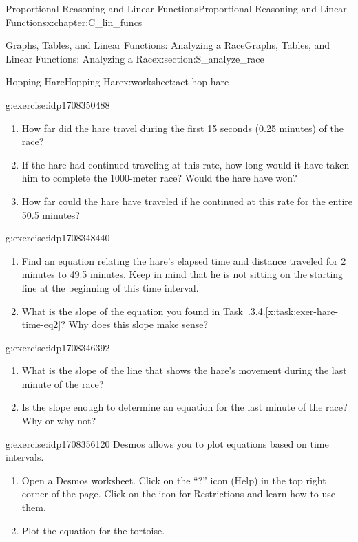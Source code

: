 \documentclass[oneside,10pt,]{book}
\newcommand{\xreffont}{\relax}
\numberwithin{equation}{chapter}
\begin{document}
\begin{chapterptx}{Proportional Reasoning and Linear Functions}{}{Proportional Reasoning and Linear Functions}{}{}{x:chapter:C_lin_funcs}
\begin{sectionptx}{Graphs, Tables, and Linear Functions: Analyzing a Race}{}{Graphs, Tables, and Linear Functions: Analyzing a Race}{}{}{x:section:S_analyze_race}
\begin{worksheet-subsection}{Hopping Hare}{}{Hopping Hare}{}{}{x:worksheet:act-hop-hare}
\begin{divisionexercise}{3}{}{}{g:exercise:idp1708350488}
\begin{enumerate}[font=\bfseries,label=(\alph*),ref=\alph*]
\item{}How far did the hare travel during the first 15 seconds (0.25 minutes) of the race?%
\item{}If the hare had continued traveling at this rate, how long would it have taken him to complete the 1000-meter race? Would the hare have won?%
\item{}How far could the hare have traveled if he continued at this rate for the entire 50.5 minutes?%
\end{enumerate}
\end{divisionexercise}%
\begin{divisionexercise}{4}{}{}{g:exercise:idp1708348440}%
\begin{enumerate}[font=\bfseries,label=(\alph*),ref=\alph*]
\item\label{x:task:exer-hare-time-eq2}Find an equation relating the hare's elapsed time and distance traveled for 2 minutes to 49.5 minutes. Keep in mind that he is not sitting on the starting line at the beginning of this time interval.%
\item{}What is the slope of the equation you found in \hyperref[x:task:exer-hare-time-eq2]{Task~{\xreffont 2.4.3.4}.{\xreffont\ref{x:task:exer-hare-time-eq2}}}? Why does this slope make sense?%
\end{enumerate}
\end{divisionexercise}%
\begin{divisionexercise}{5}{}{}{g:exercise:idp1708346392}%
\begin{enumerate}[font=\bfseries,label=(\alph*),ref=\alph*]
\item{}What is the slope of the line that shows the hare's movement during the last minute of the race?%
\item{}Is the slope enough to determine an equation for the last minute of the race? Why or why not?%
\end{enumerate}
\end{divisionexercise}%
\begin{divisionexercise}{6}{}{}{g:exercise:idp1708356120}%
Desmos allows you to plot equations based on time intervals.%
\begin{enumerate}[font=\bfseries,label=(\alph*),ref=\alph*]
\item{}Open a Desmos worksheet. Click on the ``?'' icon (Help) in the top right corner of the page. Click on the icon for Restrictions and learn how to use them.%
\item{}Plot the equation for the tortoise.%

\end{enumerate}
\end{divisionexercise}
\end{worksheet-subsection}
\end{sectionptx}
\end{chapterptx}
\end{document}
